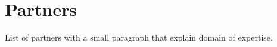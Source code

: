 \documentclass{learnpad}
\begin{document}
\chapter{Partners}
\label{ch:partners}
List of partners with a small paragraph that explain domain of expertise.









\end{document}
